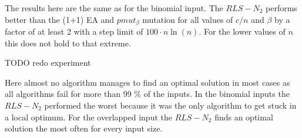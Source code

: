 The results here are the same as for the binomial input. The $RLS-N_2$ performs better than the (1+1) EA and $pmut_\beta$ mutation for all values of $c/n$ and $\beta$ by a factor of at least 2 with a step limit of $100 \cdot n \ln(n)$. For the lower values of $n$ this does not hold to that extreme.

TODO redo experiment



Here almost no algorithm manages to find an optimal solution in most cases as all algorithms fail for more than 99 \% of the inputs.
In the binomial inputs the $RLS-N_2$ performed the worst because it was the only algorithm to get stuck in a local optimum.
For the overlapped input the $RLS-N_2$ finds an optimal solution the most often for every input size.



